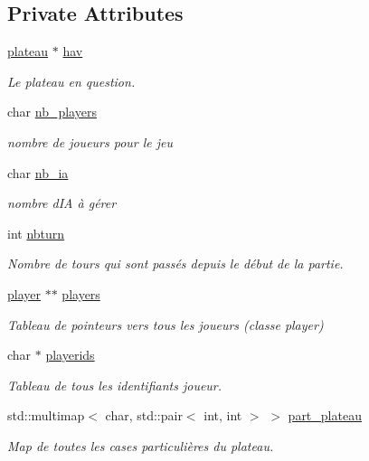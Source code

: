 \subsection*{Private Attributes}
\begin{DoxyCompactItemize}
\item 
\hyperlink{classplateau}{plateau} $\ast$ \hyperlink{classjeu_a7bd7f0a6992c018ddc2cdf2a0c6e1930}{hav}
\begin{DoxyCompactList}\small\item\em Le plateau en question. \end{DoxyCompactList}\item 
char \hyperlink{classjeu_af5d010efc2e6dec9ea8da739bd5f19b5}{nb\+\_\+players}
\begin{DoxyCompactList}\small\item\em nombre de joueurs pour le jeu \end{DoxyCompactList}\item 
char \hyperlink{classjeu_a725c0616180898259dd472d009e844fc}{nb\+\_\+ia}
\begin{DoxyCompactList}\small\item\em nombre d\textquotesingle{}IA à gérer \end{DoxyCompactList}\item 
int \hyperlink{classjeu_ae28d01ac3e91246e6269df4d62470913}{nbturn}
\begin{DoxyCompactList}\small\item\em Nombre de tours qui sont passés depuis le début de la partie. \end{DoxyCompactList}\item 
\hyperlink{classplayer}{player} $\ast$$\ast$ \hyperlink{classjeu_ae005d31d8935c2d9e7ddb53d25efcc31}{players}
\begin{DoxyCompactList}\small\item\em Tableau de pointeurs vers tous les joueurs (classe player) \end{DoxyCompactList}\item 
char $\ast$ \hyperlink{classjeu_ada4888da3a6c7036f47f47515f87a983}{playerids}
\begin{DoxyCompactList}\small\item\em Tableau de tous les identifiants joueur. \end{DoxyCompactList}\item 
std\+::multimap$<$ char, std\+::pair$<$ int, int $>$ $>$ \hyperlink{classjeu_abd8f4b8b02d750e302903f616e897ad0}{part\+\_\+plateau}
\begin{DoxyCompactList}\small\item\em Map de toutes les cases particulières du plateau. \end{DoxyCompactList}\end{DoxyCompactItemize}


